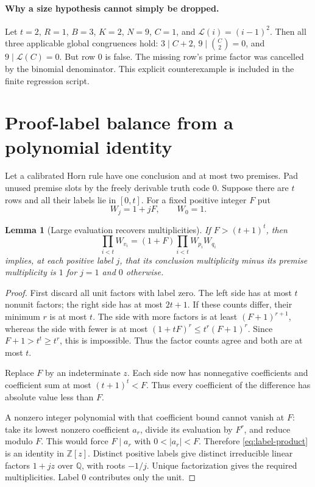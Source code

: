 \documentclass[11pt]{article}
\newtheorem{lemma}[theorem]{Lemma}
\theoremstyle{definition}
\newcommand{\Z}{\mathbb Z}
\newcommand{\Q}{\mathbb Q}
\newcommand{\LL}{\mathcal L}
\begin{document}
\paragraph{Why a size hypothesis cannot simply be dropped.}
Let $t=2$, $R=1$, $B=3$, $K=2$, $N=9$, $C=1$, and
$\LL(i)=(i-1)^2$. Then all three applicable global congruences hold:
$3\mid C+2$, $9\mid\binom C2=0$, and $9\mid\LL(C)=0$.
But row $0$ is false. The missing row's prime factor was cancelled by
the binomial denominator. This explicit counterexample is included in
the finite regression script.

\section{Proof-label balance from a polynomial identity}

Let a calibrated Horn rule have one conclusion and at most two premises.
Pad unused premise slots by the freely derivable truth code $0$. Suppose
there are $t$ rows and all their labels lie in $[0,t]$. For a fixed
positive integer $F$ put
\[
 W_j=1+jF,\qquad W_0=1.
\]

\begin{lemma}[Large evaluation recovers multiplicities]\label{lem:labels}
If $F>(t+1)^t$, then
\begin{equation}\label{eq:label-product}
 \prod_{i<t}W_{v_i}=(1+F)\prod_{i<t}W_{p_i}W_{q_i}
\end{equation}
implies, at each positive label $j$, that its conclusion multiplicity
minus its premise multiplicity is $1$ for $j=1$ and $0$ otherwise.
\end{lemma}
\begin{proof}
First discard all unit factors with label zero. The left side has at
most $t$ nonunit factors; the right side has at most $2t+1$. If these
counts differ, their minimum $r$ is at most $t$. The side with more
factors is at least $(F+1)^{r+1}$, whereas the side with fewer is at
most $(1+tF)^r\le t^r(F+1)^r$. Since $F+1>t^t\ge t^r$, this is
impossible. Thus the factor counts agree and both are at most $t$.

Replace $F$ by an indeterminate $z$. Each side now has nonnegative
coefficients and coefficient sum at most $(t+1)^t<F$. Thus every
coefficient of the difference has absolute value less than $F$.

A nonzero integer polynomial with that coefficient bound cannot vanish
at $F$: take its lowest nonzero coefficient $a_r$, divide its evaluation
by $F^r$, and reduce modulo $F$. This would force $F\mid a_r$ with
$0<|a_r|<F$. Therefore \eqref{eq:label-product} is an identity in
$\Z[z]$. Distinct positive labels give distinct irreducible linear
factors $1+jz$ over $\Q$, with roots $-1/j$. Unique factorization
gives the required multiplicities. Label $0$ contributes only the unit.
\end{proof}
\end{document}
